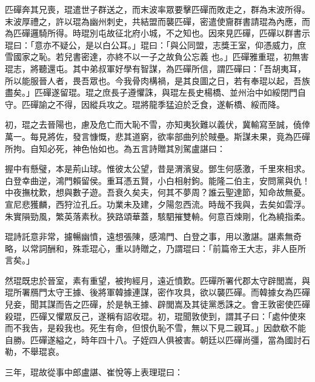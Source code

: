 \begin{pinyinscope}
 匹磾奔其兄喪，琨遣世子群送之，而末波率眾要擊匹磾而敗走之，群為末波所得。末波厚禮之，許以琨為幽州刺史，共結盟而襲匹磾，密遣使齎群書請琨為內應，而為匹磾邏騎所得。時琨別屯故征北府小城，不之知也。因來見匹磾，匹磾以群書示琨曰：「意亦不疑公，是以白公耳。」琨曰：「與公同盟，志獎王室，仰憑威力，庶雪國家之恥。若兒書密達，亦終不以一子之故負公忘義
 也。」匹磾雅重琨，初無害琨志，將聽還屯。其中弟叔軍好學有智謀，為匹磾所信，謂匹磾曰：「吾胡夷耳，所以能服晉人者，畏吾眾也。今我骨肉構禍，是其良圖之日，若有奉琨以起，吾族盡矣。」匹磾遂留琨。琨之庶長子遵懼誅，與琨左長史楊橋、並州治中如綏閉門自守。匹磾諭之不得，因縱兵攻之。琨將龍季猛迫於乏食，遂斬橋、綏而降。



 初，琨之去晉陽也，慮及危亡而大恥不雪，亦知夷狄難以義伏，冀輸寫至誠，僥倖萬一。每見將佐，發言慷慨，悲其道窮，欲率部曲列於賊壘。斯謀未果，竟為匹磾所拘。自知必死，神色怡如也。為五言詩贈其別駕盧諶曰：



 握中有懸璧，本是荊山球。惟彼太公望，昔是渭濱叟。鄧生何感激，千里來相求。白登幸曲逆，鴻門賴留侯。重耳憑五賢，小白相射鉤。能隆二伯主，安問黨與仇！中夜撫枕歎，想與數子遊。吾衰久矣夫，何其不夢周？誰云聖達節，知命故無憂。宣尼悲獲麟，西狩泣孔丘。功業未及建，夕陽忽西流。時哉不我與，去矣如雲浮。朱實隕勁風，繁英落素秋。狹路頌華蓋，駭駟摧雙輈。何意百煉剛，化為繞指柔。



 琨詩託意非常，攄暢幽憤，遠想張陳，感鴻門、白登之事，用以激諶。諶素無奇略，以常詞酬和，殊乖琨心，重以詩贈之，乃謂琨曰：「前篇帝王大志，非人臣所言矣。」



 然琨既忠於晉室，素有重望，被拘經月，遠近憤歎。匹磾所署代郡太守辟閭嵩，與琨所署鴈門太守王據、後將軍韓據連謀，密作攻具，欲以襲匹磾。而韓據女為匹磾兒妾，聞其謀而告之匹磾，於是執王據、辟閭嵩及其徒黨悉誅之。會王敦密使匹磾殺琨，匹磾又懼眾反己，遂稱有詔收琨。初，琨聞敦使到，謂其子曰：「處仲使來而不我告，是殺我也。死生有命，但恨仇恥不雪，無以下見二親耳。」因歔欷不能自勝。匹磾遂縊之，時年四十八。子姪四人俱被害。朝廷以匹磾尚彊，當為國討石勒，不舉琨哀。



 三年，琨故從事中郎盧諶、崔悅等上表理琨曰：




\end{pinyinscope}
